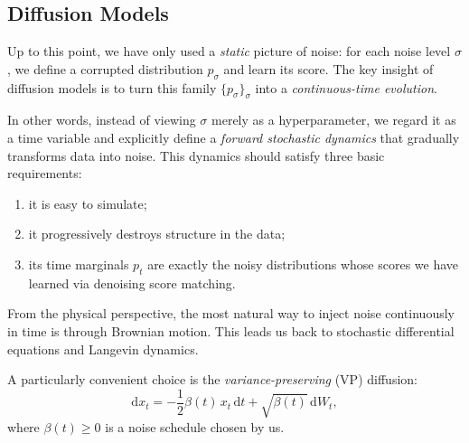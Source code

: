 \documentclass[../main]{subfiles}
\begin{document}
    \subsection{Diffusion Models}

    Up to this point, we have only used a \emph{static} picture of noise:
    for each noise level $\sigma$, we define a corrupted distribution
    $p_\sigma$ and learn its score.
    The key insight of diffusion models is to turn this family
    $\{p_\sigma\}_{\sigma}$ into a \emph{continuous-time evolution}.
    
    In other words, instead of viewing $\sigma$ merely as a hyperparameter,
    we regard it as a time variable and explicitly define a \emph{forward stochastic dynamics}
    that gradually transforms data into noise.
    This dynamics should satisfy three basic requirements:
    \begin{enumerate}
        \item it is easy to simulate;
        \item it progressively destroys structure in the data;
        \item its time marginals $p_t$ are exactly the noisy distributions
              whose scores we have learned via denoising score matching.
    \end{enumerate}
    
    From the physical perspective, the most natural way to inject noise
    continuously in time is through Brownian motion.
    This leads us back to stochastic differential equations and Langevin dynamics.
    
    A particularly convenient choice is the \emph{variance-preserving} (VP) diffusion:
    \begin{equation}\label{eq:vp-sde}
        \mathrm d x_t
        =
        -\frac{1}{2}\beta(t)\,x_t\,\mathrm dt
        +
        \sqrt{\beta(t)}\,\mathrm d W_t,
    \end{equation}
    where $\beta(t)\ge 0$ is a noise schedule chosen by us.
\end{document}
